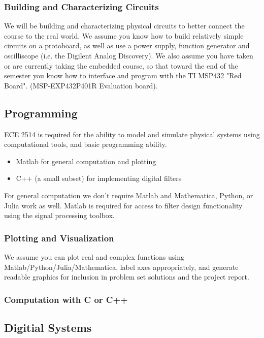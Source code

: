 \subsubsection*{Building and Characterizing Circuits}

We will be building and characterizing physical circuits to better connect the course to the real world. We assume you know how to build relatively simple circuits on a protoboard, as well as use a power supply, function generator and oscilliscope (i.e. the Digilent Analog Discovery). We also assume you have taken or are currently taking the embedded course, so that toward the end of the semester you know how to interface and program with the TI MSP432 "Red Board".
(MSP-EXP432P401R Evaluation board).

\subsection{Programming}

ECE 2514 is required for the ability to model and simulate physical systems using computational tools, and basic programming ability.

\begin{itemize}
\item Matlab for general computation and plotting
\item C++ (a small subset) for implementing digital filters
\end{itemize}

For general computation we don't require Matlab and Mathematica, Python, or Julia work as well. Matlab is required for access to filter design functionality using the signal processing toolbox. 

\subsubsection*{Plotting and Visualization}

We assume you can plot real and complex functions using Matlab/Python/Julia/Mathematica, label axes appropriately, and generate readable graphics for inclusion in problem set solutions and the project report.

\subsubsection*{Computation with C or C++}

\subsection{Digitial Systems}


